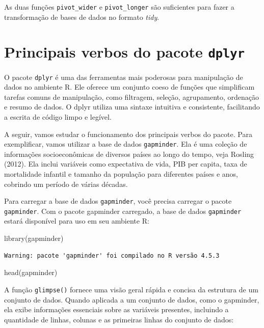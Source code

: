 \documentclass[
  portuguese,
  letterpaper,
  DIV=11,
  numbers=noendperiod]{scrreprt}
\newenvironment{Shaded}{\begin{snugshade}}{\end{snugshade}}
\newcommand{\FunctionTok}[1]{\textcolor[rgb]{0.28,0.35,0.67}{#1}}
\newcommand{\NormalTok}[1]{\textcolor[rgb]{0.00,0.23,0.31}{#1}}
\theoremstyle{definition}
\theoremstyle{remark}
\begin{document}
As duas funções \texttt{pivot\_wider} e \texttt{pivot\_longer} são
suficientes para fazer a transformação de bases de dados no formato
\emph{tidy}.

\section{\texorpdfstring{Principais verbos do pacote
\texttt{dplyr}}{Principais verbos do pacote dplyr}}\label{principais-verbos-do-pacote-dplyr}

O pacote \texttt{dplyr} é uma das ferramentas mais poderosas para
manipulação de dados no ambiente R. Ele oferece um conjunto coeso de
funções que simplificam tarefas comuns de manipulação, como filtragem,
seleção, agrupamento, ordenação e resumo de dados. O dplyr utiliza uma
sintaxe intuitiva e consistente, facilitando a escrita de código limpo e
legível.

A seguir, vamos estudar o funcionamento dos principais verbos do pacote.
Para exemplificar, vamos utilizar a base de dados \texttt{gapminder}.
Ela é uma coleção de informações socioeconômicas de diversos países ao
longo do tempo, veja Rosling (2012). Ela inclui variáveis como
expectativa de vida, PIB per capita, taxa de mortalidade infantil e
tamanho da população para diferentes países e anos, cobrindo um período
de várias décadas.

Para carregar a base de dados \texttt{gapminder}, você precisa carregar
o pacote \texttt{gapminder}. Com o pacote gapminder carregado, a base de
dados \texttt{gapminder} estará disponível para uso em seu ambiente R:

\begin{Shaded}
\begin{Highlighting}[]
\FunctionTok{library}\NormalTok{(gapminder)}
\end{Highlighting}
\end{Shaded}

\begin{verbatim}
Warning: pacote 'gapminder' foi compilado no R versão 4.5.3
\end{verbatim}

\begin{Shaded}
\begin{Highlighting}[]
\FunctionTok{head}\NormalTok{(gapminder)}
\end{Highlighting}
\end{Shaded}

A função \texttt{glimpse()} fornece uma visão geral rápida e concisa da
estrutura de um conjunto de dados. Quando aplicada a um conjunto de
dados, como o gapminder, ela exibe informações essenciais sobre as
variáveis presentes, incluindo a quantidade de linhas, colunas e as
primeiras linhas do conjunto de dados:
\end{document}
